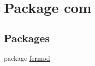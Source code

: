 \hypertarget{a00015}{}\section{Package com}
\label{a00015}
\subsection*{Packages}
\begin{DoxyCompactItemize}
\item 
package \mbox{\hyperlink{a00016}{fermod}}
\end{DoxyCompactItemize}
